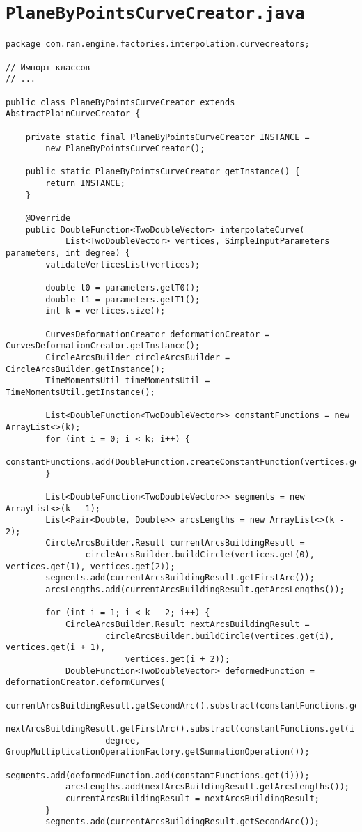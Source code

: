 \section*{\texttt{PlaneByPointsCurveCreator.java}}
\begin{verbatim}
package com.ran.engine.factories.interpolation.curvecreators;

// Импорт классов
// ...

public class PlaneByPointsCurveCreator extends AbstractPlainCurveCreator {

    private static final PlaneByPointsCurveCreator INSTANCE =
        new PlaneByPointsCurveCreator();

    public static PlaneByPointsCurveCreator getInstance() {
        return INSTANCE;
    }

    @Override
    public DoubleFunction<TwoDoubleVector> interpolateCurve(
            List<TwoDoubleVector> vertices, SimpleInputParameters parameters, int degree) {
        validateVerticesList(vertices);

        double t0 = parameters.getT0();
        double t1 = parameters.getT1();
        int k = vertices.size();

        CurvesDeformationCreator deformationCreator = CurvesDeformationCreator.getInstance();
        CircleArcsBuilder circleArcsBuilder = CircleArcsBuilder.getInstance();
        TimeMomentsUtil timeMomentsUtil = TimeMomentsUtil.getInstance();

        List<DoubleFunction<TwoDoubleVector>> constantFunctions = new ArrayList<>(k);
        for (int i = 0; i < k; i++) {
            constantFunctions.add(DoubleFunction.createConstantFunction(vertices.get(i)));
        }

        List<DoubleFunction<TwoDoubleVector>> segments = new ArrayList<>(k - 1);
        List<Pair<Double, Double>> arcsLengths = new ArrayList<>(k - 2);
        CircleArcsBuilder.Result currentArcsBuildingResult =
                circleArcsBuilder.buildCircle(vertices.get(0), vertices.get(1), vertices.get(2));
        segments.add(currentArcsBuildingResult.getFirstArc());
        arcsLengths.add(currentArcsBuildingResult.getArcsLengths());

        for (int i = 1; i < k - 2; i++) {
            CircleArcsBuilder.Result nextArcsBuildingResult =
                    circleArcsBuilder.buildCircle(vertices.get(i), vertices.get(i + 1),
                        vertices.get(i + 2));
            DoubleFunction<TwoDoubleVector> deformedFunction = deformationCreator.deformCurves(
                    currentArcsBuildingResult.getSecondArc().substract(constantFunctions.get(i)),
                    nextArcsBuildingResult.getFirstArc().substract(constantFunctions.get(i)),
                    degree, GroupMultiplicationOperationFactory.getSummationOperation());
            segments.add(deformedFunction.add(constantFunctions.get(i)));
            arcsLengths.add(nextArcsBuildingResult.getArcsLengths());
            currentArcsBuildingResult = nextArcsBuildingResult;
        }
        segments.add(currentArcsBuildingResult.getSecondArc());


\end{verbatim}
